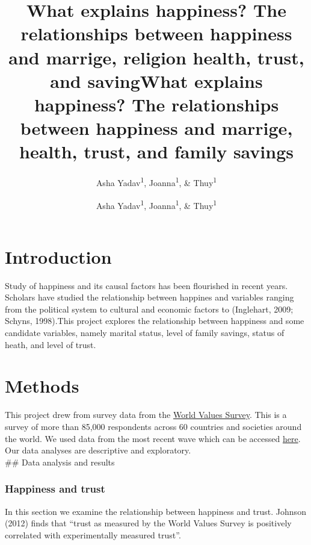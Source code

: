 \documentclass[man, fleqn, noextraspace,floatsintext]{apa6}
\title{What explains happiness? The relationships between happiness and marrige, religion health, trust, and saving}
\author{Asha Yadav\textsuperscript{1}, Joanna\textsuperscript{1}, \& Thuy\textsuperscript{1}}
\title{What explains happiness? The relationships between happiness and
marrige, health, trust, and family savings}
\author{Asha Yadav\textsuperscript{1}, Joanna\textsuperscript{1}, \&
Thuy\textsuperscript{1}}
\date{}
\affiliation{
\vspace{0.5cm}
\textsuperscript{1} University of Oregon}
\begin{document}
\maketitle

\section{Introduction}\label{introduction}

Study of happiness and its causal factors has been flourished in recent
years. Scholars have studied the relationship between happines and
variables ranging from the political system to cultural and economic
factors to (Inglehart, 2009; Schyns, 1998).This project explores the
relationship between happiness and some candidate variables, namely
marital status, level of family savings, status of heath, and level of
trust.

\section{Methods}\label{methods}

This project drew from survey data from the
\href{http://www.worldvaluessurvey.org/WVSContents.jsp}{World Values
Survey}. This is a survey of more than 85,000 respondents across 60
countries and societies around the world. We used data from the most
recent wave which can be accessed
\href{http://www.worldvaluessurvey.org/WVSDocumentationWV6.jsp}{here}.
Our data analyses are descriptive and exploratory.\\
\#\# Data analysis and results

\subsubsection{Happiness and trust}\label{happiness-and-trust}

In this section we examine the relationship between happiness and trust.
Johnson (2012) finds that \enquote{trust as measured by the World Values
Survey is positively correlated with experimentally measured trust}.
\end{document}
